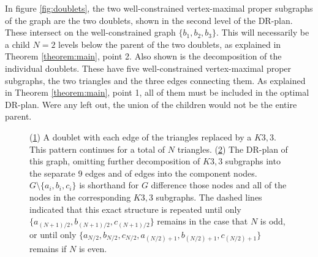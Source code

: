 \begin{example}
    In figure \ref{fig:doublets}, the two well-constrained vertex-maximal proper subgraphs of the graph are the two doublets, shown in the second level of the DR-plan. These intersect on the well-constrained graph $\{b_1,b_2,b_3\}$. This will necessarily be a child $N=2$ levels below the parent of the two doublets, as explained in Theorem \ref{theorem:main}, point 2. Also shown is the decomposition of the individual doublets. These have five well-constrained vertex-maximal proper subgraphs, the two triangles and the three edges connecting them. As explained in Theorem \ref{theorem:main}, point 1, all of them must be included in the optimal DR-plan. Were any left out, the union of the children would not be the entire parent.
\end{example}



\begin{figure*}\centering
\begin{subfigure}{.3\linewidth}\centering
    
    \caption{}\label{fig:c2c3ofk33s:a}
\end{subfigure}%
\begin{subfigure}{.7\linewidth}\centering
    
    \caption{}\label{fig:c2c3ofk33s:b}
\end{subfigure}

\caption{(\ref{fig:c2c3ofk33s:a}) A doublet with each edge of the triangles replaced by a $K3,3$. This pattern continues for a total of $N$ triangles. (\ref{fig:c2c3ofk33s:b}) The DR-plan of this graph, omitting further decomposition of $K3,3$ subgraphs into the separate 9 edges and of edges into the component nodes. $G\setminus\{a_i,b_i,c_i\}$ is shorthand for $G$ difference those nodes and all of the nodes in the corresponding $K3,3$ subgraphs. The dashed lines indicated that this exact structure is repeated until only $\{a_{(N+1)/2},b_{(N+1)/2},c_{(N+1)/2}\}$ remains in the case that $N$ is odd, or until only $\{a_{N/2},b_{N/2},c_{N/2},a_{(N/2)+1},b_{(N/2)+1},c_{(N/2)+1}\}$ remains if $N$ is even.}
\label{fig:c2c3ofk33s}
\end{figure*}






